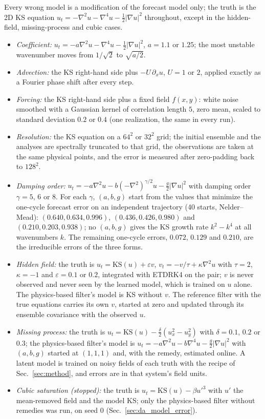  Every wrong model is a modification of the forecast model only; the truth is the
2D KS equation $u_t=-\nabla^2u-\nabla^4u-\tfrac12|\nabla u|^2$ throughout, except in the hidden-field,
missing-process and cubic cases.
\begin{itemize}
\item \emph{Coefficient:} $u_t=-a\nabla^2u-\nabla^4u-\tfrac12|\nabla u|^2$, $a=1.1$ or $1.25$; the most unstable
  wavenumber moves from $1/\sqrt2$ to $\sqrt{a/2}$.
\item \emph{Advection:} the KS right-hand side plus $-U\,\partial_xu$, $U=1$ or $2$, applied exactly as a Fourier
  phase shift after every step.
\item \emph{Forcing:} the KS right-hand side plus a fixed field $f(x,y)$: white noise smoothed with a
  Gaussian kernel of correlation length $5$, zero mean, scaled to standard deviation $0.2$ or $0.4$ (one
  realization, the same in every run).
\item \emph{Resolution:} the KS equation on a $64^2$ or $32^2$ grid; the initial ensemble and the analyses
  are spectrally truncated to that grid, the observations are taken at the same physical points, and
  the error is measured after zero-padding back to $128^2$.
\item \emph{Damping order:} $u_t=-a\nabla^2u-b(-\nabla^2)^{\gamma/2}u-\tfrac g2|\nabla u|^2$ with damping order $\gamma=5$, $6$ or $8$. For each
  $\gamma$, $(a,b,g)$ start from the values that minimize the one-cycle forecast error on an independent
  trajectory (40 starts, Nelder--Mead): $(0.640, 0.634, 0.996)$, $(0.436, 0.426, 0.980)$ and
  $(0.210, 0.203, 0.938)$; no $(a,b,g)$ gives the KS growth rate $k^2-k^4$ at all wavenumbers $k$. The
  remaining one-cycle errors, $0.072$, $0.129$ and $0.210$, are the irreducible errors of the three forms.
\item \emph{Hidden field:} the truth is $u_t=\mathrm{KS}(u)+\varepsilon v$, $v_t=-v/\tau+\kappa\nabla^2u$ with $\tau=2$,
  $\kappa=-1$ and $\varepsilon=0.1$ or $0.2$, integrated with ETDRK4 on the pair; $v$ is never observed and never
  seen by the learned model, which is trained on $u$ alone. The physics-based filter's model is KS
  without $v$. The reference filter with the true equations carries its own $v$, started at zero and
  updated through its ensemble covariance with the observed $u$.
\item \emph{Missing process:} the truth is $u_t=\mathrm{KS}(u)-\tfrac{\delta}{2}(u_x^2-u_y^2)$ with $\delta=0.1$, $0.2$
  or $0.3$; the physics-based filter's model is $u_t=-a\nabla^2u-b\nabla^4u-\tfrac g2|\nabla u|^2$ with $(a,b,g)$
  started at $(1,1,1)$ and, with the remedy, estimated online. A latent model is trained on noisy fields
  of each truth with the recipe of Sec.~\ref{sec:method}, and errors are in that system's field units.
\item \emph{Cubic saturation (stopped):} the truth is $u_t=\mathrm{KS}(u)-\beta u'^3$ with $u'$ the mean-removed
  field and the model KS; only the physics-based filter without remedies was run, on seed 0
  (Sec.~\ref{sec:da_model_error}).
\end{itemize}

